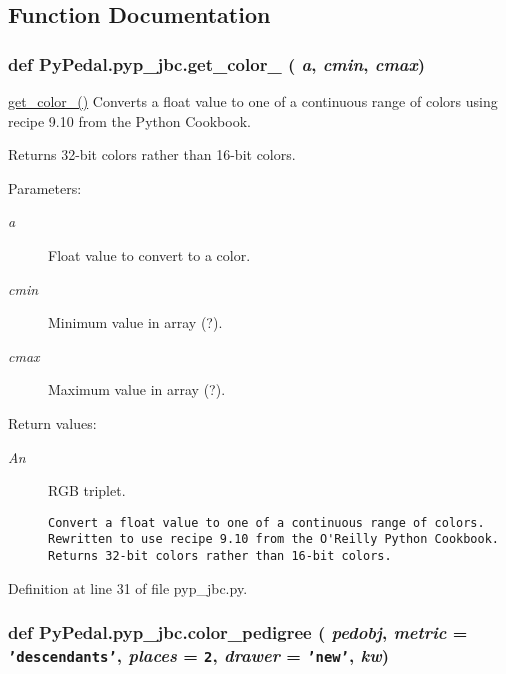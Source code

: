 \subsection{Function Documentation}
\hypertarget{namespacePyPedal_1_1pyp__jbc_684ddf07aa8b4275b4de4025306bb8ac}{
\subsubsection[get\_\-color\_\-32]{\setlength{\rightskip}{0pt plus 5cm}def Py\-Pedal.pyp\_\-jbc.get\_\-color\_ ( {\em a},  {\em cmin},  {\em cmax})}}
\label{namespacePyPedal_1_1pyp__jbc_684ddf07aa8b4275b4de4025306bb8ac}


\hyperlink{namespacePyPedal_1_1pyp__jbc_684ddf07aa8b4275b4de4025306bb8ac}{get\_\-color\_()} Converts a float value to one of a continuous range of colors using recipe 9.10 from the Python Cookbook. 

Returns 32-bit colors rather than 16-bit colors. \begin{Desc}
\item[Parameters:]
\begin{description}
\item[{\em a}]Float value to convert to a color. \item[{\em cmin}]Minimum value in array (?). \item[{\em cmax}]Maximum value in array (?). \end{description}
\end{Desc}
\begin{Desc}
\item[Return values:]
\begin{description}
\item[{\em An}]RGB triplet.

\footnotesize\begin{verbatim}Convert a float value to one of a continuous range of colors.
Rewritten to use recipe 9.10 from the O'Reilly Python Cookbook.
Returns 32-bit colors rather than 16-bit colors.
\end{verbatim}
\normalsize
 \end{description}
\end{Desc}


Definition at line 31 of file pyp\_\-jbc.py.\hypertarget{namespacePyPedal_1_1pyp__jbc_dbc1c88a0fcf403645e7310f6b6da99f}{
\subsubsection[color\_\-pedigree]{\setlength{\rightskip}{0pt plus 5cm}def Py\-Pedal.pyp\_\-jbc.color\_\-pedigree ( {\em pedobj},  {\em metric} = {\tt 'descendants'},  {\em places} = {\tt 2},  {\em drawer} = {\tt 'new'},  {\em kw})}}
\label{namespacePyPedal_1_1pyp__jbc_dbc1c88a0fcf403645e7310f6b6da99f}


